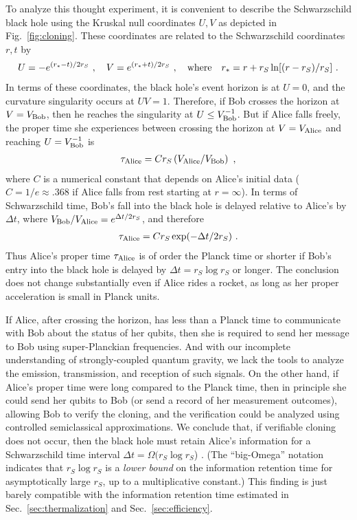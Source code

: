 \documentclass[11pt]{article}
\begin{document}
To analyze this thought experiment, it is convenient to describe the Schwarzschild black hole using the Kruskal null coordinates $U,V$ as depicted in Fig.~\ref{fig:cloning}. These coordinates are related to the Schwarzschild coordinates $r,t$ by
\begin{eqnarray}
U=-e^{(r_*-t)/2r_S}~,\quad V=e^{(r_*+t)/2r_S}~,\quad {\rm where} \quad r_*=r+r_S\ln[(r-r_S)/r_S]~.
\end{eqnarray}
In terms of these coordinates, the black hole's event horizon is at $U=0$, and the curvature singularity occurs at $UV=1$. Therefore, if Bob crosses the horizon at $V=V_{\rm Bob}$, then he reaches the singularity at $U\le V_{\rm Bob}^{-1}$. But if Alice falls freely, the proper time she experiences between crossing the horizon at $V=V_{\rm Alice}$ and reaching $U=V_{\rm Bob}^{-1}$ is 
\begin{eqnarray}
\tau_{\rm Alice}= Cr_S\left({V_{\rm Alice}}/{V_{\rm Bob}}\right)~,
\end{eqnarray}
where $C$ is a numerical constant that depends on Alice's initial data ($C=1/e\approx .368$ if Alice falls from rest starting at $r=\infty$). In terms of Schwarzschild time, Bob's fall into the black hole is delayed relative to Alice's by $\Delta t$, where $V_{\rm Bob}/V_{\rm Alice}= e^{\Delta t/2r_S}$, and therefore
\begin{eqnarray}
\tau_{\rm Alice}= C  r_S\exp(-\Delta t/2r_S)~.
\end{eqnarray}
Thus Alice's proper time $\tau_{\rm Alice}$ is of order the Planck time or shorter if Bob's entry into the black hole is delayed by $\Delta t = r_S\log r_S$ or longer. The conclusion does not change substantially even if Alice rides a rocket, as long as her proper acceleration is small in Planck units. 

If Alice, after crossing the horizon, has less than a Planck time to communicate with Bob about the status of her qubits, then she is required to send her message to Bob using super-Planckian frequencies. And with our incomplete understanding of strongly-coupled quantum gravity, we lack the tools to analyze the emission, transmission, and reception of such signals. On the other hand, if Alice's proper time were long compared to the Planck time, then in principle she could send her qubits to Bob (or send a record of her measurement outcomes), allowing Bob to verify the cloning, and the verification could be analyzed using controlled semiclassical approximations. We conclude that, if verifiable cloning does not occur, then the black hole must retain Alice's information for a Schwarzschild time interval $\Delta t=\Omega(r_S\log r_S$) \cite{susskind-gedanken,preskill-unpublished}. (The ``big-Omega'' notation indicates that $r_S\log r_S$ is a {\em lower bound} on the information retention time for asymptotically large $r_S$, up to a multiplicative constant.) This finding is just barely compatible with the information retention time estimated in Sec.~\ref{sec:thermalization} and Sec.~\ref{sec:efficiency}.
\end{document}
